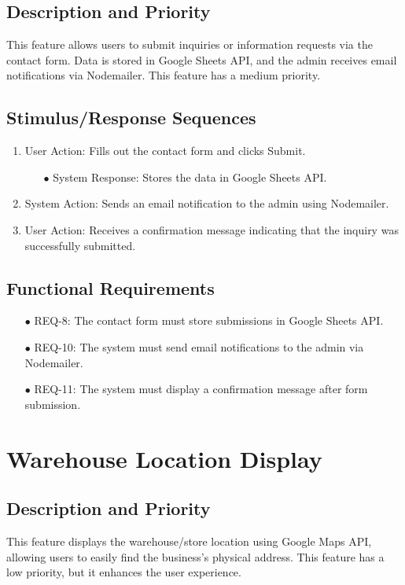 \documentclass[oneside,a4paper,12pt,explicit]{book}
\begin{document}
\subsection{Description and Priority}
This feature allows users to submit inquiries or information requests via the contact form. Data is stored in Google Sheets API, and the admin receives email notifications via Nodemailer. This feature has a medium priority.

\subsection{Stimulus/Response Sequences}
\begin{enumerate}
    \item User Action: Fills out the contact form and clicks Submit.
    \begin{enumerate}
        \item[$\bullet$] System Response: Stores the data in Google Sheets API.
    \end{enumerate}
    \item System Action: Sends an email notification to the admin using Nodemailer.
    \item User Action: Receives a confirmation message indicating that the inquiry was successfully submitted.
\end{enumerate}

\subsection{Functional Requirements}
\begin{enumerate}
    \item[$\bullet$] REQ-8: The contact form must store submissions in Google Sheets API.
    \item[$\bullet$] REQ-10: The system must send email notifications to the admin via Nodemailer.
    \item[$\bullet$] REQ-11: The system must display a confirmation message after form submission.
\end{enumerate}

\section{Warehouse Location Display}

\subsection{Description and Priority}
This feature displays the warehouse/store location using Google Maps API, allowing users to easily find the business’s physical address. This feature has a low priority, but it enhances the user experience.
\end{document}
